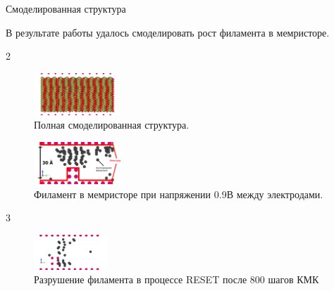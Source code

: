 \documentclass{beamer}%
\begin{document}




\begin{frame}{Смоделированная структура}{}

В результате работы удалось смоделировать рост филамента в мемристоре.

\begin {multicols} {2}

\begin{figure}
    \centering
    \includegraphics[height=60px]{img/11000_full_ex.pdf}
    \caption{Полная смоделированная структура.
    }
\end{figure}
\columnbreak

\begin{figure}
    \centering
    \includegraphics[height=60px]{img/11000_ex.pdf}
    \caption{Филамент в мемристоре при напряжении 0.9В между электродами.
    }
\end{figure}

\end{multicols}

\begin {multicols} {3}

\begin{figure}
    \centering
    \includegraphics[height=50px]{img/80.pdf}
    \caption{Разрушение филамента в процессе RESET после 800 шагов КМК
    }
\end{figure}


\end{multicols}
\end{frame}
\end{document}
